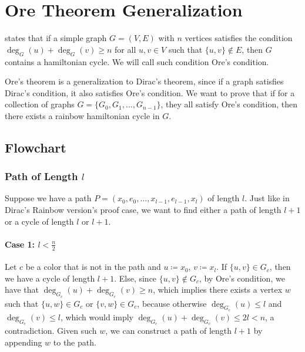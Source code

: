 
\chapter{Ore Theorem Generalization}

\cite{Ore_1960} states that if a simple graph $G = (V, E)$ with $n$ vertices satisfies the condition 
$\deg_G(u) + \deg_G(v) \geq n$ for all $u, v \in V$ such that $\{u, v\} \not\in E$, then $G$ contains a hamiltonian cycle.
We will call such condition Ore's condition.

Ore's theorem is a generalization to Dirac's theorem, since if a graph satisfies Dirac's condition, it also satisfies Ore's condition.
We want to prove that if for a collection of graphs $G = \{G_0, G_1, \ldots, G_{n-1}\}$, they all satisfy Ore's condition, 
then there exists a rainbow hamiltonian cycle in \(G\).

\section{Flowchart}

\subsection{Path of Length $l$}

Suppose we have a path \( P = (x_0, e_0, \dots, x_{l-1}, e_{l-1}, x_{l}) \) of length \( l \). 
Just like in Dirac's Rainbow version's proof case, 
we want to find either a path of length \( l+1 \) or a cycle of length \( l \) or \( l+1 \). 

\subsubsection{Case 1: \( l < \frac{n}{2} \)}

Let \( c \) be a color that is not in the path and \(u \coloneqq x_0\), \(v \coloneqq x_{l}\). 
If \( \{u, v\} \in G_c \), then we have a cycle of length \( l+1 \).
Else, since \( \{u, v\} \not\in G_c \), by Ore's condition, 
we have that \( \deg_{G_c}(u) + \deg_{G_c}(v) \geq n \), which implies there exists a 
vertex \( w \) such that \( \{u, w\} \in G_c \) or \( \{v, w\} \in G_c \), because otherwise
\( \deg_{G_c}(u) \leq l  \) and \( \deg_{G_c}(v) \leq l \), 
which would imply \( \deg_{G_c}(u) + \deg_{G_c}(v) \leq 2l < n \), a contradiction.
Given such \(w\), we can construct a path of length \( l+1 \) by appending \(w\) to the path.

